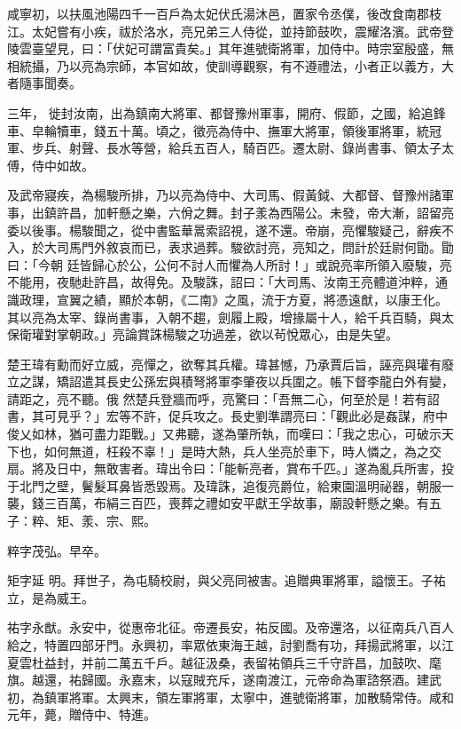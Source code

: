 \begin{pinyinscope}
 咸寧初，以扶風池陽四千一百戶為太妃伏氏湯沐邑，置家令丞僕，後改食南郡枝江。太妃嘗有小疾，祓於洛水，亮兄弟三人侍從，並持節鼓吹，震耀洛濱。武帝登陵雲臺望見，曰：「伏妃可謂富貴矣。」其年進號衛將軍，加侍中。時宗室殷盛，無相統攝，乃以亮為宗師，本官如故，使訓導觀察，有不遵禮法，小者正以義方，大者隨事聞奏。



 三年，
 徙封汝南，出為鎮南大將軍、都督豫州軍事，開府、假節，之國，給追鋒車、皁輪犢車，錢五十萬。頃之，徵亮為侍中、撫軍大將軍，領後軍將軍，統冠軍、步兵、射聲、長水等營，給兵五百人，騎百匹。遷太尉、錄尚書事、領太子太傅，侍中如故。



 及武帝寢疾，為楊駿所排，乃以亮為侍中、大司馬、假黃鉞、大都督、督豫州諸軍事，出鎮許昌，加軒懸之樂，六佾之舞。封子羕為西陽公。未發，帝大漸，詔留亮委以後事。楊駿聞之，從中書監華暠索詔視，遂不還。帝崩，亮懼駿疑己，辭疾不入，於大司馬門外敘哀而已，表求過葬。駿欲討亮，亮知之，問計於廷尉何勖。勖曰：「今朝
 廷皆歸心於公，公何不討人而懼為人所討！」或說亮率所領入廢駿，亮不能用，夜馳赴許昌，故得免。及駿誅，詔曰：「大司馬、汝南王亮體道沖粹，通識政理，宣翼之績，顯於本朝，《二南》之風，流于方夏，將憑遠猷，以康王化。其以亮為太宰、錄尚書事，入朝不趨，劍履上殿，增掾屬十人，給千兵百騎，與太保衛瓘對掌朝政。」亮論賞誅楊駿之功過差，欲以茍悅眾心，由是失望。



 楚王瑋有勳而好立威，亮憚之，欲奪其兵權。瑋甚憾，乃承賈后旨，誣亮與瓘有廢立之謀，矯詔遣其長史公孫宏與積弩將軍李肇夜以兵圍之。帳下督李龍白外有變，請距之，亮不聽。俄
 然楚兵登牆而呼，亮驚曰：「吾無二心，何至於是！若有詔書，其可見乎？」宏等不許，促兵攻之。長史劉準謂亮曰：「觀此必是姦謀，府中俊乂如林，猶可盡力距戰。」又弗聽，遂為肇所執，而嘆曰：「我之忠心，可破示天下也，如何無道，枉殺不辜！」是時大熱，兵人坐亮於車下，時人憐之，為之交扇。將及日中，無敢害者。瑋出令曰：「能斬亮者，賞布千匹。」遂為亂兵所害，投于北門之壁，鬢髮耳鼻皆悉毀焉。及瑋誅，追復亮爵位，給東園溫明祕器，朝服一襲，錢三百萬，布絹三百匹，喪葬之禮如安平獻王孚故事，廟設軒懸之樂。有五子：粹、矩、羕、宗、熙。



 粹字茂弘。早卒。



 矩字延
 明。拜世子，為屯騎校尉，與父亮同被害。追贈典軍將軍，謚懷王。子祐立，是為威王。



 祐字永猷。永安中，從惠帝北征。帝遷長安，祐反國。及帝還洛，以征南兵八百人給之，特置四部牙門。永興初，率眾依東海王越，討劉喬有功，拜揚武將軍，以江夏雲杜益封，并前二萬五千戶。越征汲桑，表留祐領兵三千守許昌，加鼓吹、麾旗。越還，祐歸國。永嘉末，以寇賊充斥，遂南渡江，元帝命為軍諮祭酒。建武初，為鎮軍將軍。太興末，領左軍將軍，太寧中，進號衛將軍，加散騎常侍。咸和元年，薨，贈侍中、特進。




\end{pinyinscope}
